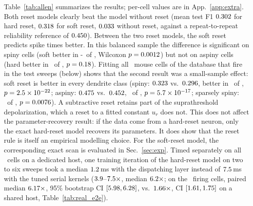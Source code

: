 \documentclass[10pt]{article}
\theoremstyle{remark}
\begin{document}
Table~\ref{tab:allen} summarizes the results; per-cell values are in App.~\ref{app:extra}. Both reset models clearly beat the model without reset (mean test F1 $0.302$ for hard reset, $0.318$ for soft reset, $0.033$ without reset, against a repeat-to-repeat reliability reference of $0.450$). Between the two reset models, the soft reset predicts spike times better. In this balanced sample the difference is significant on spiny cells (soft better in \the\numexpr\BigSpinyN-\BigSpinyWins\relax\ of \BigSpinyN, Wilcoxon $p=0.0012$) but not on aspiny cells (hard better in \BigAspinyWins\ of \BigAspinyN, $p=0.18$). Fitting all \DbCells\ mouse cells of the database that fire in the test sweeps (below) shows that the second result was a small-sample effect: soft reset is better in every dendrite class (spiny: $0.323$ vs.\ $0.296$, better in \DbSpinySoftWins\ of \DbSpinyN, $p=2.5\times10^{-22}$; aspiny: $0.475$ vs.\ $0.452$, \DbAspinySoftWins\ of \DbAspinyN, $p=5.7\times10^{-17}$; sparsely spiny: \DbSparseSoftWins\ of \DbSparseN, $p=0.0076$). A subtractive reset retains part of the suprathreshold depolarization, which a reset to a fitted constant $u_r$ does not. This does not affect the parameter-recovery result: if the data come from a hard-reset neuron, only the exact hard-reset model recovers its parameters. It does show that the reset rule is itself an empirical modelling choice. For the soft-reset model, the corresponding exact scan is evaluated in Sec.~\ref{sec:exp}. Timed separately on all \AllenSpeedCells\ cells on a dedicated host, one training iteration of the hard-reset model on two to six sweeps took a median $1.2$\,ms with the dispatching layer instead of $7.5$\,ms with the tuned serial kernels ($3.9$--$7.5\times$, median $6.2\times$; on the \RealAuditCells\ firing cells, paired median $6.17\times$, 95\% bootstrap CI $[5.98,6.28]$, vs.\ $1.66\times$, CI $[1.61,1.75]$ on a shared host, Table~\ref{tab:real_e2e}).

\begin{table}[t]
\centering\small

\caption{LIF models fitted to Allen Cell Types recordings (mouse visual cortex). Columns 3--6: mean spike-time F1 ($\pm4$\,ms) on held-out noise sweeps; ``reliability'' is the cells' repeat-to-repeat reliability reference (F1 between repeated presentations of the test stimulus; not a strict upper bound, as deterministic models exceed it in \RelExceedHard/\RelExceedCells\ hard and \RelExceedSoft/\RelExceedCells\ soft fits). Last two columns: cells in which the hard-reset model has the higher F1, and a two-sided Wilcoxon signed-rank test of hard vs.\ soft.}
\label{tab:allen}
\end{table}
\end{document}
